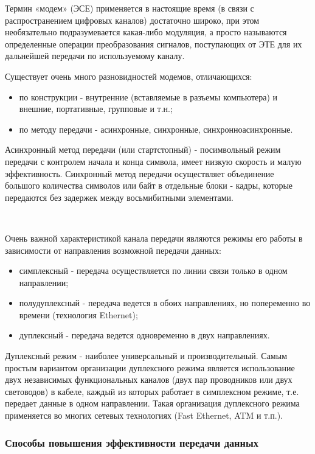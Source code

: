 \documentclass[a4paper]{report}
\begin{document}
Термин «модем» (ЭСЕ) применяется в настоящие время (в связи с распространением цифровых каналов) достаточно широко, при этом необязательно подразумевается какая-либо модуляция, а просто называются определенные операции преобразования сигналов, поступающих от ЭТЕ для их дальнейшей передачи по используемому каналу.

Существует очень много разновидностей модемов, отличающихся:
\begin{itemize}
\item по конструкции - внутренние (вставляемые в разъемы компьютера) и внешние, портативные, групповые и т.н.;
\item по методу передачи - асинхронные, синхронные, синхронноасинхронные.
\end{itemize}

Асинхронный метод передачи (или стартстопный) - посимвольный режим передачи с контролем начала и конца символа, имеет низкую скорость и малую эффективность. Синхронный метод передачи осуществляет объединение большого количества символов или байт в отдельные блоки - кадры, которые передаются без задержек между восьмибитными элементами.

~

Очень важной характеристикой канала передачи являются режимы его работы в зависимости от направления возможной передачи данных:
\begin{itemize}
\item симплексный - передача осуществляется по линии связи только в одном направлении;
\item полудуплексный - передача ведется в обоих направлениях, но попеременно во времени (технология Ethernet);
\item дуплексный - передача ведется одновременно в двух направлениях.
\end{itemize}

Дуплексный режим - наиболее универсальный и производительный. Самым простым вариантом организации дуплексного режима является использование двух независимых функциональных каналов (двух пар проводников или двух световодов) в кабеле, каждый из которых работает в симплексном режиме, т.е. передает данные в одном направлении. Такая организация дуплексного режима применяется во многих сетевых технологиях (Fast Ethernet, ATM и т.п.).

\subsubsection{Способы повышения эффективности передачи данных}
\end{document}

